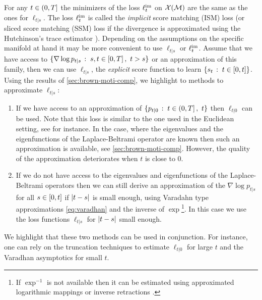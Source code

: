     For any $t \in \left(0,T\right]$ the minimizers of the loss $\ell^{\mathrm{im}}_t$ on $\mathcal{X}(\mathcal{M})$
    are the same as the ones for $\ell_{t|s}$. The loss $\ell^{\mathrm{im}}_t$ is called the
    \emph{implicit} score matching (ISM) loss (or sliced score matching (SSM)
    loss if the divergence is approximated using the Hutchinson's trace
    estimator \cite{hutchinson1989stochastic}).  Depending on the assumptions on
    the specific manifold at hand it may be more convenient to use $\ell_{t|s}$
    or $\ell^{\mathrm{im}}_t$.  Assume that we have access to
    $\{\nabla \log p_{t|s}\,:\; s, t \in \left[0,T\right], \ t > s\}$ or an
    approximation of this family, then we can use $\ell_{t|s}$, the
    \emph{explicit} score function to learn
    $\{s_t\,:\; t \in \left[0,t\right]\}$. Using the results of
    \cref{sec:brown-moti-comp}, we highlight to methods to approximate
    $\ell_{t|s}$:
    \begin{enumerate}[label= (\alph*),  wide, labelwidth=!, labelindent=0pt]
    \item If we have access to an approximation of
      $\ensembleLigne{p_{t|0}}{t \in \ocint{0,T}, \ t}$ then $\ell_{t|0}$ can be
      used. Note that this loss is similar to the one used in the Euclidean
      setting, see
      \citep{song2020score,song2020improved,song2020denoising,ho2020denoising}
      for instance. In the case, where the eigenvalues and the eigenfunctions of
      the Laplace-Beltrami operator are known then such an approximation is
      available, see \cref{sec:brown-moti-comp}. However, the quality of the
      approximation deteriorates when $t$ is close to
      $0$. %
    \item If we do not have access to the eigenvalues and eigenfunctions of the
      Laplace-Beltrami operators then we can still derive an approximation of
      the $\nabla \log p_{t|s}$ for all $s \in \left[0,t\right]$ if $\left\vert t-s \right\vert$ is
      small enough, using Varadahn type approximations \eqref{eq:varadhan} and
      the inverse of $\exp$\footnote{If $\exp^{-1}$ is not available then it can
        be estimated using approximated logarithmic mappings
        \citep{goto2021approximated,schiela2020sqp} or inverse retractions
        \citep{zhu2020riemannian,sato2019riemannian}.}. In this case we use the
      loss functions $\ell_{t|s}$ for $\vert t-s \vert$ small enough.
    \end{enumerate}
    We highlight that these two methods can be used in conjunction. For
    instance, one can rely on the truncation techniques to estimate $\ell_{t|0}$
    for large $t$ and the Varadhan asymptotics for small $t$.
    
